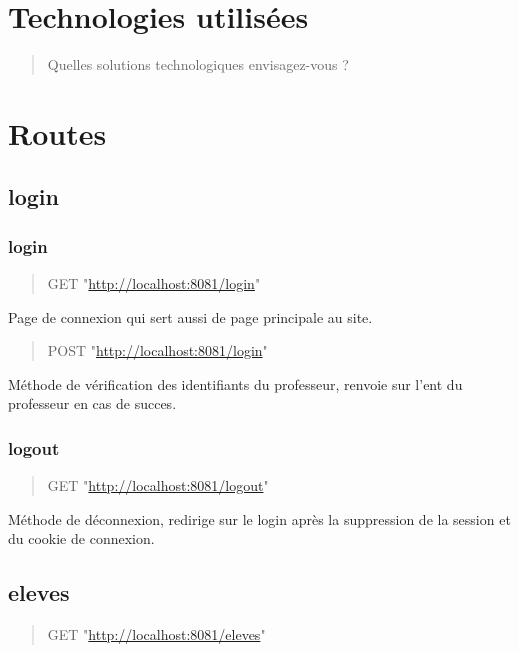 \documentclass[11pt]{article}
\begin{document}
\section{Technologies utilisées}
\label{sec:org7289004}
\begin{quote}
Quelles solutions technologiques envisagez-vous ?
\end{quote}

\section{Routes}
\label{sec:org7dacbae}
\subsection{login}
\label{sec:org8bdbe68}
\subsubsection{login}
\label{sec:org9b51c1a}

\begin{quote}
GET "\url{http://localhost:8081/login}"
\end{quote}

Page de connexion qui sert aussi de page principale au site.

\begin{quote}
POST "\url{http://localhost:8081/login}"
\end{quote}

Méthode de vérification des identifiants du professeur, renvoie sur l'ent du professeur en cas 
de succes.

\subsubsection{logout}
\label{sec:orgaa564a5}

\begin{quote}
GET "\url{http://localhost:8081/logout}"
\end{quote}

Méthode de déconnexion, redirige sur le login après la suppression de la session
et du cookie de connexion.

\subsection{eleves}
\label{sec:org5190c36}

\begin{quote}
GET "\url{http://localhost:8081/eleves}"
\end{quote}
\end{document}
